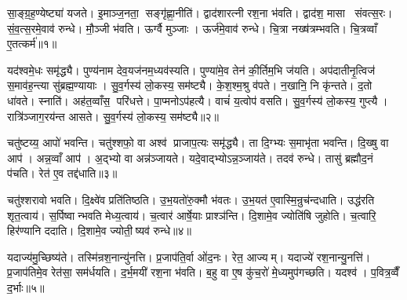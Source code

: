 

\clearpage
{}
\setcounter{anuvakam}{0}
सा॒ङ्ग्र॒ह॒ण्येष्ट्या॑ यजते। इ॒माञ्ज॒नता॒ सङ्गृ॑ह्णा॒नीति॑। द्वाद॑शारत्नी रश॒ना भ॑वति। द्वाद॑श॒ मासा संवत्स॒रः। सं॒व॒त्स॒रमे॒वाव॑ रुन्धे। मौ॒ञ्जी भ॑वति। ऊर्ग्वै मुञ्जाः। ऊर्ज॑मे॒वाव॑ रुन्धे। चि॒त्रा नख्ष॑त्रम्भवति। चि॒त्रव्वाँ ए॒तत्कर्म॑॥१॥

यद॑श्वमे॒धः समृ॑द्ध्यै। पुण्य॑नाम देव॒यज॑नम॒ध्यव॑स्यति। पुण्या॑मे॒व तेन॑ की॒र्तिम॒भि ज॑यति। अप॑दातीनृ॒त्विज॑ स॒माव॑ह॒न्त्या सु॑ब्रह्म॒ण्यायाः। सु॒व॒र्गस्य॑ लो॒कस्य॒ सम॑ष्ट्यै। के॒श॒श्म॒श्रु व॑पते। न॒खानि॒ नि कृ॑न्तते। द॒तो धा॑वते। स्नाति॑। अह॑त॒व्वाँस॒ परि॑धत्ते। पा॒प्मनोऽप॑हत्यै। वाचं॑ य॒त्वोप॑ वसति। सु॒व॒र्गस्य॑ लो॒कस्य॒ गुप्त्यै। रात्रि॑ञ्जाग॒रय॑न्त आसते। सु॒व॒र्गस्य॑ लो॒कस्य॒ सम॑ष्ट्यै॥२॥\anuvakamend[कर्म॑ धत्ते॒ पञ्च॑ च]

चतु॑ष्टय्य॒ आपो॑ भवन्ति। चतु॑श्शफो॒ वा अश्व॑ प्राजाप॒त्यः समृ॑द्ध्यै। ता दि॒ग्भ्यः स॒माभृ॑ता भवन्ति। दि॒ख्षु वा आप॑। अन्न॒व्वाँ आप॑। अ॒द्भ्यो वा अन्न॑ञ्जायते। यदे॒वाद्भ्योऽन्न॒ञ्जाय॑ते। तदव॑ रुन्धे। तासु॑ ब्रह्मौद॒नं प॑चति। रेत॑ ए॒व तद्द॑धाति॥३॥

चतु॑श्शरावो भवति। दि॒क्ष्वे॑व प्रति॑तिष्ठति। उ॒भ॒यतो॑रु॒क्मौ भ॑वतः। उ॒भ॒यत॑ ए॒वास्मि॒न्रुच॑न्दधाति। उद्ध॑रति शृत॒त्वाय॑। स॒र्पिष्वान्भवति मेध्य॒त्वाय॑। च॒त्वार॑ आर्\mbox{}षे॒याः प्राश्ञ॑न्ति। दि॒शामे॒व ज्योति॑षि जुहोति। च॒त्वारि॒ हिर॑ण्यानि ददाति। दि॒शामे॒व ज्योती॒ष्यव॑ रुन्धे॥४॥

यदाज्य॑मु॒च्छिष्य॑ते। तस्मि॑न्रश॒नान्यु॑नत्ति। प्र॒जाप॑ति॒र्वा ओ॑द॒नः। रेत॒ आज्यम्। यदाज्ये॑ रश॒नान्यु॒नत्ति॑। प्र॒जाप॑तिमे॒व रेत॑सा॒ सम॑र्धयति। द॒र्भ॒मयी॑ रश॒ना भ॑वति। ब॒हु वा ए॒ष कु॑च॒रो॑ मे॒ध्यमुप॑गच्छति। यदश्व॑। प॒वित्र॒व्वैँ द॒र्भाः॥५॥

